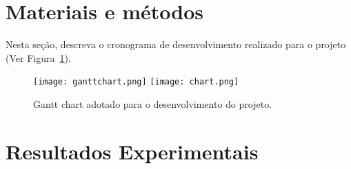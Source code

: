 \documentclass[12pt]{article}
\begin{document}
\section{Materiais e métodos}

Nesta seção, descreva o cronograma de desenvolvimento realizado para o projeto (Ver Figura~\ref{fig:gantt}).

\begin{figure}[H]
  \begin{center}    
    \texttt{[image: ganttchart.png]}
    \texttt{[image: chart.png]}
    \caption{\label{fig:gantt} Gantt chart adotado para o desenvolvimento do projeto.}
  \end{center}
\end{figure}

\section{Resultados Experimentais}
\end{document}
